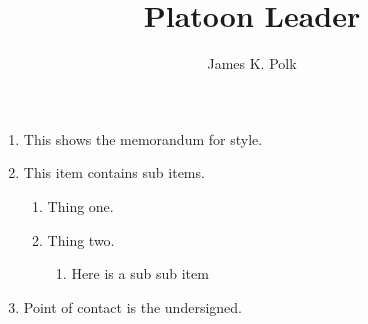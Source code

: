 \documentclass{/app/resources/latex/armymemo-notikz}
\author{James K. Polk}\rank{1LT}\branch{EN}
\title{Platoon Leader}
\begin{document}
\begin{enumerate}
\item This shows the memorandum for style.
\item This item contains sub items.
\begin{enumerate}
\item Thing one.
\item Thing two.
\begin{enumerate}
\item Here is a sub sub item
\end{enumerate}
\end{enumerate}
\item Point of contact is the undersigned.
\end{enumerate}
\end{document}
